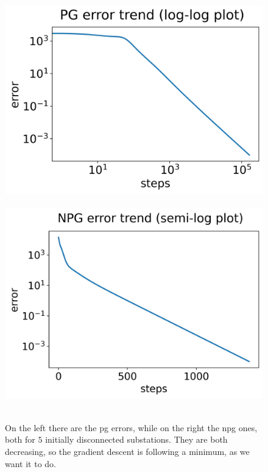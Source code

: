 \begin{figure}[htb]
    \centering
    \mbox{
        \hspace*{-10pt}\includegraphics[scale=0.52]{chapters/figures/errors_log_log_PG.png}
        \hspace*{-5pt}\includegraphics[scale=0.52]{chapters/figures/errors_log_NPG.png}
    }
    \caption{On the left there are the \acrshort{pg} errors, while on the right the \acrshort{npg} ones, both for $5$ initially disconnected substations. They are both decreasing, so the gradient descent is following a minimum, as we want it to do.}
    \label{fig:errors}
\end{figure}

